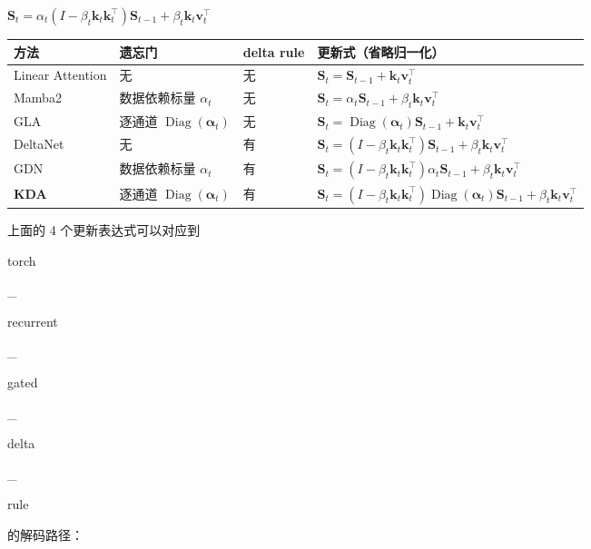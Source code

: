 \documentclass[zihao=false,fontset=windows]{ctexart}
\newcommand{\bigmath}[1]{%
  \begin{center}\large$\displaystyle #1$\end{center}%
}
\begin{document}
\bigmath{\mathbf S_t=\alpha_t(I-\beta_t\mathbf k_t\mathbf k_t^{\top})\mathbf S_{t-1}+\beta_t\mathbf k_t\mathbf v_t^{\top}}
\begin{center}\renewcommand{\arraystretch}{1.3}\begin{tabularx}{\linewidth}{|p{1.9cm}|p{1.65cm}|p{.7cm}|>{\raggedright\arraybackslash}X|}
\hline
\rowcolor{tableHead}
方法 & 遗忘门 & delta rule & 更新式（省略归一化）\\\hline
Linear Attention & 无 & 无 & $\mathbf S_t=\mathbf S_{t-1}+\mathbf k_t\mathbf v_t^{\top}$\\\hline
Mamba2 & 数据依赖标量 $\alpha_t$ & 无 & $\mathbf S_t=\alpha_t\mathbf S_{t-1}+\beta_t\mathbf k_t\mathbf v_t^{\top}$\\\hline
GLA & 逐通道 $\operatorname{Diag}(\boldsymbol\alpha_t)$ & 无 & $\mathbf S_t=\operatorname{Diag}(\boldsymbol\alpha_t)\mathbf S_{t-1}+\mathbf k_t\mathbf v_t^{\top}$\\\hline
DeltaNet & 无 & 有 & $\mathbf S_t=(I-\beta_t\mathbf k_t\mathbf k_t^{\top})\mathbf S_{t-1}+\beta_t\mathbf k_t\mathbf v_t^{\top}$\\\hline
GDN & 数据依赖标量 $\alpha_t$ & 有 & $\mathbf S_t=(I-\beta_t\mathbf k_t\mathbf k_t^{\top})\alpha_t\mathbf S_{t-1}+\beta_t\mathbf k_t\mathbf v_t^{\top}$\\\hline
\textcolor{feishuRed}{\textbf{KDA}} & 逐通道 $\operatorname{Diag}(\boldsymbol\alpha_t)$ & 有 & $\mathbf S_t=(I-\beta_t\mathbf k_t\mathbf k_t^{\top})\operatorname{Diag}(\boldsymbol\alpha_t)\mathbf S_{t-1}+\beta_t\mathbf k_t\mathbf v_t^{\top}$\\\hline
\end{tabularx}\end{center}
上面的 4 个更新表达式可以对应到 {\setlength{\fboxsep}{0pt}\colorbox{inlinebg}{\strut\ttfamily torch}\colorbox{inlinebg}{\strut\ttfamily \_}\allowbreak{}\colorbox{inlinebg}{\strut\ttfamily recurrent}\colorbox{inlinebg}{\strut\ttfamily \_}\allowbreak{}\colorbox{inlinebg}{\strut\ttfamily gated}\colorbox{inlinebg}{\strut\ttfamily \_}\allowbreak{}\colorbox{inlinebg}{\strut\ttfamily delta}\colorbox{inlinebg}{\strut\ttfamily \_}\allowbreak{}\colorbox{inlinebg}{\strut\ttfamily rule}} 的解码路径：
\end{document}
